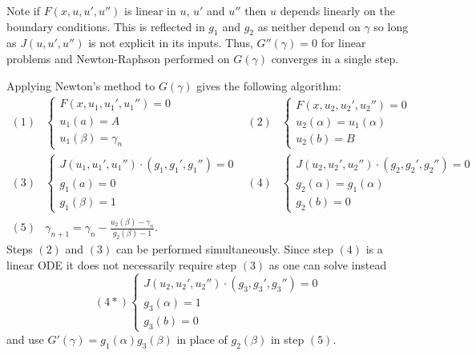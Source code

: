 \documentclass{article}
\begin{document}
Note if $F(x,u,u',u'')$ is linear in $u$, $u'$ and $u''$ then $u$ depends linearly on the boundary conditions.
This is reflected in $g_1$ and $g_2$ as neither depend on $\gamma$ so long as $J(u,u',u'')$ is not explicit in its inputs.
Thus, $G''(\gamma) = 0$ for linear problems and Newton-Raphson performed on $G(\gamma)$ converges in a single step.

Applying Newton's method to $G(\gamma)$ gives the following algorithm:
\begin{equation}
\begin{aligned} \label{alg:ASPN}
(1) & \begin{cases} F(x,u_1,u_1',u_1'') = 0 \\ u_1(a) = A \\ u_1(\beta) = \gamma_n \end{cases} &
(2) & \begin{cases} F(x,u_2,u_2',u_2'') = 0 \\ u_2(\alpha) = u_1(\alpha) \\ u_2(b) = B \end{cases} \\
(3) & \begin{cases} J(u_1,u_1',u_1'') \cdot (g_1,g_1',g_1'') = 0 \\ g_1(a) = 0 \\ g_1(\beta) = 1 \end{cases} &
(4) & \begin{cases} J(u_2,u_2',u_2'') \cdot (g_2,g_2',g_2'') = 0 \\ g_2(\alpha) = g_1(\alpha) \\ g_2(b) = 0 \end{cases} \\
(5) & \gamma_{n+1} = \gamma_n - \frac{ u_2(\beta) - \gamma_n }{g_2(\beta) - 1}. & &
\end{aligned}
\end{equation}
Steps $(2)$ and $(3)$ can be performed simultaneously.
Since step $(4)$ is a linear ODE it does not necessarily require step $(3)$ as one can solve instead
\begin{equation*}
(4*) \begin{cases} J(u_2,u_2',u_2'') \cdot (g_3,\textit{g}_3',\textit{g}_3'') = 0 \\
g_3(\alpha) = 1 \\ g_3(b) = 0 \end{cases}
\end{equation*}
and use $G'(\gamma) = g_1(\alpha) g_3(\beta)$ in place of $g_2(\beta)$ in step $(5)$.
\end{document}
